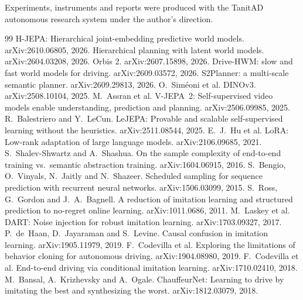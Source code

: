\documentclass[10pt,twocolumn]{article}
\makeatletter
\theoremstyle{remark}
\renewcommand\paragraph{\@startsection{paragraph}{4}{\z@}{1.6ex \@plus .5ex \@minus .2ex}{-1em}{\normalfont\normalsize\bfseries}}
\makeatother
\begin{document}
\paragraph{Acknowledgements.} Experiments, instruments and reports were produced with the TanitAD autonomous research system under
the author's direction.

\begin{thebibliography}{99}\footnotesize\setlength{\itemsep}{0.5pt}\setlength{\parsep}{0pt}
 H-JEPA: Hierarchical joint-embedding predictive world models. arXiv:2610.06805, 2026.
 Hierarchical planning with latent world models. arXiv:2604.03208, 2026.
 Orbis 2. arXiv:2607.15898, 2026.
 Drive-HWM: slow and fast world models for driving. arXiv:2609.03572, 2026.
 S2Planner: a multi-scale semantic planner. arXiv:2609.29813, 2026.
 O.~Sim\'eoni et al. DINOv3. arXiv:2508.10104, 2025.
 M.~Assran et al. V-JEPA~2: Self-supervised video models enable understanding, prediction and planning. arXiv:2506.09985, 2025.
 R.~Balestriero and Y.~LeCun. LeJEPA: Provable and scalable self-supervised learning without the heuristics. arXiv:2511.08544, 2025.
 E.~J.~Hu et al. LoRA: Low-rank adaptation of large language models. arXiv:2106.09685, 2021.
 S.~Shalev-Shwartz and A.~Shashua. On the sample complexity of end-to-end training vs.\ semantic abstraction training. arXiv:1604.06915, 2016.
 S.~Bengio, O.~Vinyals, N.~Jaitly and N.~Shazeer. Scheduled sampling for sequence prediction with recurrent neural networks. arXiv:1506.03099, 2015.
 S.~Ross, G.~Gordon and J.~A.~Bagnell. A reduction of imitation learning and structured prediction to no-regret online learning. arXiv:1011.0686, 2011.
 M.~Laskey et al. DART: Noise injection for robust imitation learning. arXiv:1703.09327, 2017.
 P.~de~Haan, D.~Jayaraman and S.~Levine. Causal confusion in imitation learning. arXiv:1905.11979, 2019.
 F.~Codevilla et al. Exploring the limitations of behavior cloning for autonomous driving. arXiv:1904.08980, 2019.
 F.~Codevilla et al. End-to-end driving via conditional imitation learning. arXiv:1710.02410, 2018.
 M.~Bansal, A.~Krizhevsky and A.~Ogale. ChauffeurNet: Learning to drive by imitating the best and synthesizing the worst. arXiv:1812.03079, 2018.

\end{thebibliography}
\end{document}
